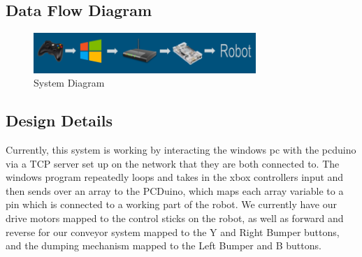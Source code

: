 \subsection{Data Flow Diagram}

\begin{figure}[tbh]
\begin{center}
\includegraphics[width=0.75\textwidth]{./telecomm}
\end{center}
\caption{System Diagram \label{systemdiagram}}
\end{figure}

\subsection{Design Details}
Currently, this system is working by interacting the windows pc with the pcduino via a TCP server set up on the network that they are both connected to. The windows program repeatedly loops and takes in the xbox controllers input and then sends over an array to the PCDuino, which maps each array variable to a pin which is connected to a working part of the robot. We currently have our drive motors mapped to the control sticks on the robot, as well as forward and reverse for our conveyor system mapped to the Y and Right Bumper buttons, and the dumping mechanism mapped to the Left Bumper and B buttons.


